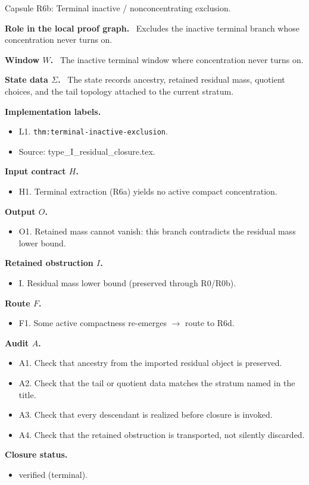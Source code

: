 \documentclass[11pt]{amsart}
\newcommand{\capsulefield}[1]{\par\smallskip\noindent\textbf{#1.}\ }
\begin{document}
\begin{proofcapsule}{Capsule R6b: Terminal inactive / nonconcentrating exclusion.}
  \capsulefield{Role in the local proof graph}
  Excludes the inactive terminal branch whose concentration never turns on.

  \capsulefield{Window \(W\)}
The inactive terminal window where concentration never turns on.

  \capsulefield{State data \(\Sigma\)}
The state records ancestry, retained residual mass, quotient choices, and the tail topology attached to the current stratum.

  \capsulefield{Implementation labels}
  \begin{itemize}[leftmargin=1.8em]
  \item L1. \texttt{thm:terminal-inactive-exclusion}.
  \item Source: type\_I\_residual\_closure.tex.
  \end{itemize}

  \capsulefield{Input contract \(H\)}
  \begin{itemize}[leftmargin=1.8em]
  \item H1. Terminal extraction (R6a) yields no active compact concentration.
  \end{itemize}

  \capsulefield{Output \(O\)}
  \begin{itemize}[leftmargin=1.8em]
  \item O1. Retained mass cannot vanish: this branch contradicts the residual mass lower bound.
  \end{itemize}

  \capsulefield{Retained obstruction \(I\)}
  \begin{itemize}[leftmargin=1.8em]
  \item I. Residual mass lower bound (preserved through R0/R0b).
  \end{itemize}

  \capsulefield{Route \(F\)}
  \begin{itemize}[leftmargin=1.8em]
  \item F1. Some active compactness re-emerges $\to$ route to R6d.
  \end{itemize}

  \capsulefield{Audit \(A\)}
  \begin{itemize}[leftmargin=1.8em]
  \item A1. Check that ancestry from the imported residual object is preserved.
  \item A2. Check that the tail or quotient data matches the stratum named in the title.
  \item A3. Check that every descendant is realized before closure is invoked.
  \item A4. Check that the retained obstruction is transported, not silently discarded.
  \end{itemize}
  \capsulefield{Closure status}
  \begin{itemize}[leftmargin=1.8em]
  \item verified (terminal).
  \end{itemize}
\end{proofcapsule}
\end{document}
